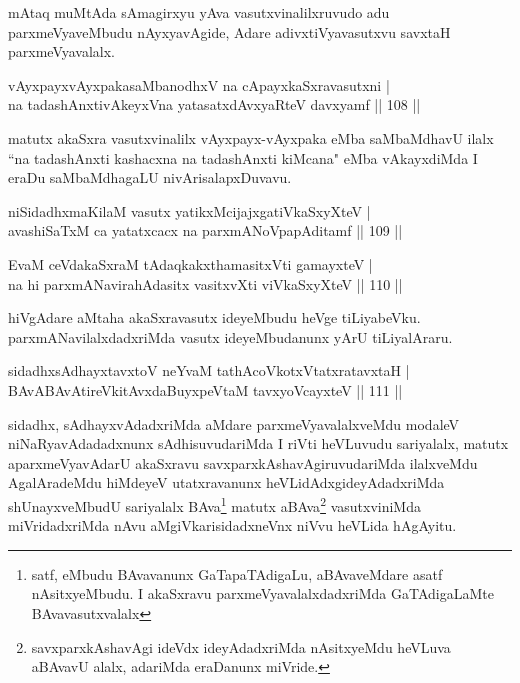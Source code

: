 \begin{artha}
mAtaq muMtAda sAmagirxyu yAva vasutxvinalilxruvudo adu parxmeVya\-veMbudu nAyxyavAgide, Adare adivxtiVyavasutxvu savxtaH parxmeVyavalalx.
\end{artha}

\begin{shl}
vAyxpayxvAyxpakasaMbanodhxV na cApayxkaSxravasutxni |\\
na tadashAnxtivAkeyxVna yatasatxdAvxyaRteV davxyamf \hfill || 108 ||
\end{shl}

\begin{artha}
matutx akaSxra vasutxvinalilx vAyxpayx-vAyxpaka eMba saMbaMdhavU ilalx ``na tadashAnxti kashacxna na tadashAnxti kiMcana" eMba vAkayxdiMda I eraDu saMbaMdhagaLU nivArisalapxDuvavu.
\end{artha}

\begin{shl}
niSidadhxmaKilaM vasutx yatikxMcijajxgatiVkaSxyXteV |\\
avashiSaTxM ca yatatxcacx na parxmANoVpapAditamf \hfill || 109 ||
\end{shl}

\begin{shl}
EvaM ceVdakaSxraM tAdaqkakxthamasitxVti gamayxteV |\\
na hi parxmANavirahAdasitx vasitxvXti viVkaSxyXteV \hfill || 110 ||
\end{shl}

\begin{artha}
hiVgAdare aMtaha akaSxravasutx ideyeMbudu heVge tiLiyabeVku. parxmANa\-vilalxdadxriMda vasutx ideyeMbudanunx yArU tiLiyalAraru.
\end{artha}

\begin{shl}
sidadhxsAdhayxtavxtoV neYvaM tathAcoVkotxVtatxratavxtaH |\\
BAvABAvAtireVkitAvxdaBuyxpeVtaM tavxyoVcayxteV \hfill || 111 ||
\end{shl}

\begin{artha}
sidadhx, sAdhayxvAdadxriMda aMdare parxmeVyavalalxveMdu modaleV niNaRyavAda\-dadxnunx sAdhisuvudariMda I riVti heVLuvudu sariyalalx, matutx aparxmeVyavAdarU akaSxravu savxparxkAshavAgiruvudariMda ilalxveMdu AgalAradeMdu hiMdeyeV utatxra\-vanunx heVLidAdxgideyAdadxriMda shUnayxveMbudU sariyalalx BAva\footnote[1]{satf, eMbudu BAvavanunx GaTapaTAdigaLu, aBAvaveMdare asatf nAsitxyeMbudu. I akaSxravu parxmeVyavalalxdadxriMda GaTAdigaLaMte BAvavasutxvalalx} matutx aBAva\footnote[2]{savxparxkAshavAgi ideVdx ideyAdadxriMda nAsitxyeMdu heVLuva aBAvavU alalx, adariMda eraDanunx miVride.} vasutxviniMda  miVridadxriMda nAvu aMgiVkarisidadxneVnx niVvu heVLida hAgAyitu.
\end{artha}%


